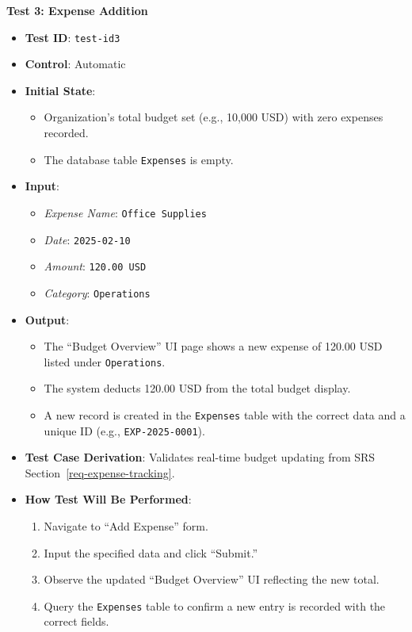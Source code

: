\documentclass[12pt, titlepage]{article}
\begin{document}
\textbf{Test 3: Expense Addition}
\begin{itemize}
    \item \textbf{Test ID}: \texttt{test-id3}
    \item \textbf{Control}: Automatic
    \item \textbf{Initial State}:
    \begin{itemize}
        \item Organization's total budget set (e.g., 10,000 USD) with zero expenses recorded.
        \item The database table \texttt{Expenses} is empty.
    \end{itemize}
    \item \textbf{Input}:
    \begin{itemize}
        \item \textit{Expense Name}: \texttt{Office Supplies}
        \item \textit{Date}: \texttt{2025-02-10}
        \item \textit{Amount}: \texttt{120.00 USD}
        \item \textit{Category}: \texttt{Operations}
    \end{itemize}
    \item \textbf{Output}:
    \begin{itemize}
        \item The ``Budget Overview'' UI page shows a new expense of 120.00 USD listed under \texttt{Operations}.
        \item The system deducts 120.00 USD from the total budget display.
        \item A new record is created in the \texttt{Expenses} table with the correct data and a unique ID (e.g., \texttt{EXP-2025-0001}).
    \end{itemize}
    \item \textbf{Test Case Derivation}:
    Validates real-time budget updating from SRS Section~\ref{req-expense-tracking}.
    \item \textbf{How Test Will Be Performed}:
    \begin{enumerate}
        \item Navigate to ``Add Expense'' form.
        \item Input the specified data and click ``Submit.''
        \item Observe the updated ``Budget Overview'' UI reflecting the new total.
        \item Query the \texttt{Expenses} table to confirm a new entry is recorded with the correct fields.
    \end{enumerate}
\end{itemize}
\end{document}
